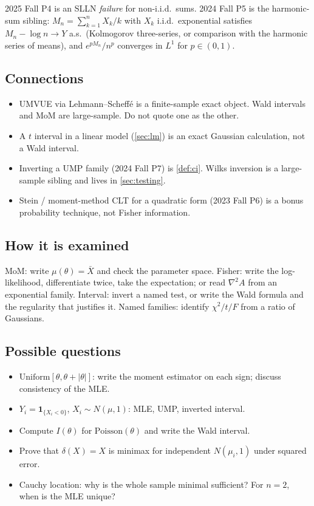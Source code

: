 2025 Fall P4 is an SLLN \emph{failure} for non-i.i.d.\ sums. 2024 Fall P5 is the harmonic-sum sibling: \(M_{n}=\sum_{k=1}^{n}X_{k}/k\) with \(X_{k}\) i.i.d.\ exponential satisfies \(M_{n}-\log n\to Y\) a.s.\ (Kolmogorov three-series, or comparison with the harmonic series of means), and \(e^{pM_{n}}/n^{p}\) converges in \(L^{1}\) for \(p\in(0,1)\).

\subsection{Connections}

\begin{itemize}
    \item UMVUE via Lehmann--Scheff\'e is a finite-sample exact object. Wald intervals and MoM are large-sample. Do not quote one as the other.
    \item A \(t\) interval in a linear model (\cref{sec:lm}) is an exact Gaussian calculation, not a Wald interval.
    \item Inverting a UMP family (2024 Fall P7) is \cref{def:ci}. Wilks inversion is a large-sample sibling and lives in \cref{sec:testing}.
    \item Stein / moment-method CLT for a quadratic form (2023 Fall P6) is a bonus probability technique, not Fisher information.
\end{itemize}

\subsection{How it is examined}

MoM: write \(\mu(\theta)=\bar X\) and check the parameter space. Fisher: write the log-likelihood, differentiate twice, take the expectation; or read \(\nabla^{2}A\) from an exponential family. Interval: invert a named test, or write the Wald formula and the regularity that justifies it. Named families: identify \(\chi^{2}/t/F\) from a ratio of Gaussians.

\subsection{Possible questions}

\begin{itemize}
    \item \(\mathrm{Uniform}[\theta,\theta+\lvert\theta\rvert]\): write the moment estimator on each sign; discuss consistency of the MLE.
    \item \(Y_{i}=\mathbf{1}_{\{X_{i}<0\}}\), \(X_{i}\sim N(\mu,1)\): MLE, UMP, inverted interval.
    \item Compute \(I(\theta)\) for \(\mathrm{Poisson}(\theta)\) and write the Wald interval.
    \item Prove that \(\delta(X)=X\) is minimax for independent \(N(\mu_{i},1)\) under squared error.
    \item Cauchy location: why is the whole sample minimal sufficient? For \(n=2\), when is the MLE unique?
\end{itemize}

